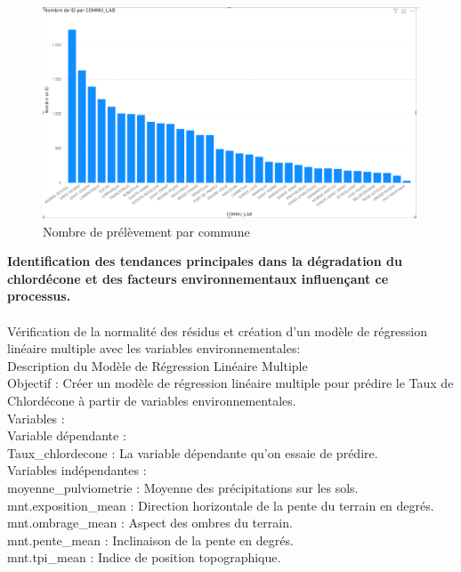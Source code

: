 \documentclass{report}
\begin{document}
\begin{figure}[!h]
\centering
\includegraphics[width = 1
\linewidth]{nombre_prel_par_commune.png}
\caption{Nombre de prélèvement par commune}
\end{figure}

\textbf{Identification des tendances principales dans la dégradation du chlordécone et des facteurs environnementaux influençant ce processus.} \\ \\ 

Vérification de la normalité des résidus et  création d'un modèle de régression linéaire multiple avec les variables environnementales:\\  
Description du Modèle de Régression Linéaire Multiple\\
Objectif : Créer un modèle de régression linéaire multiple pour prédire le Taux de Chlordécone à partir de variables environnementales.\\

Variables :\\

Variable dépendante :\\

Taux\_chlordecone : La variable dépendante qu'on essaie de prédire.\\
Variables indépendantes :\\
moyenne\_pulviometrie : Moyenne des précipitations sur les sols.\\
mnt.exposition\_mean : Direction horizontale de la pente du terrain en degrés.\\
mnt.ombrage\_mean : Aspect des ombres du terrain.\\
mnt.pente\_mean : Inclinaison de la pente en degrés.\\
mnt.tpi\_mean : Indice de position topographique.\\
\end{document}
